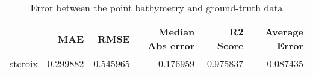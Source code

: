 \begin{table}[h!]
\caption{Error between the point bathymetry and ground-truth data}
\label{tab:stcroix_lidar_error}
\begin{tabular}{lrrrrr}
\toprule
 & MAE & RMSE & Median Abs error & R2 Score & Average Error \\
\midrule
stcroix & 0.299882 & 0.545965 & 0.176959 & 0.975837 & -0.087435 \\
\bottomrule
\end{tabular}
\end{table}
